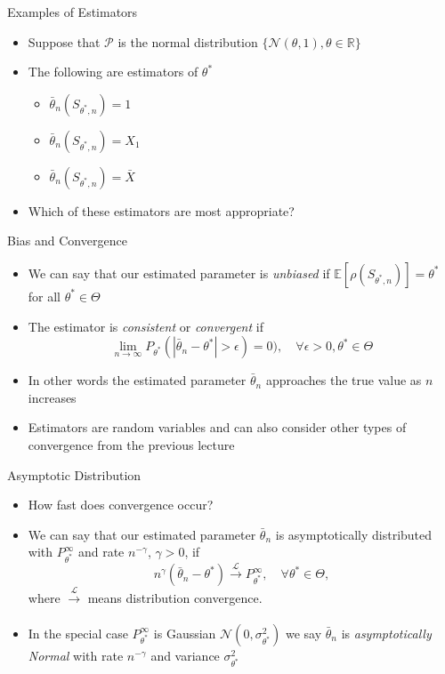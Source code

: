 \documentclass{beamer}
\begin{document}
\begin{frame}{Examples of Estimators}  
\begin{itemize} 
 \item Suppose that $\mathcal{P}$ is the normal distribution $\{\mathcal{N}(\theta, 1), \theta \in \mathbb{R}\}$  
 \item The following are estimators of $\theta^*$ 
 \begin{itemize}
 \item $\bar{\theta}_n(S_{\theta^*,n}) = 1$
 \item $\bar{\theta}_n(S_{\theta^*,n}) = X_1$
 \item $\bar{\theta}_n(S_{\theta^*,n}) = \bar{X}$
 \end{itemize} 
 \item Which of these estimators are most appropriate? 
\end{itemize}
\end{frame}

\begin{frame}{Bias and Convergence}  
\begin{itemize} 
\item We can say that our estimated parameter is \emph{unbiased} if $\mathbb{E}[\rho(S_{\theta^*,n})] = \theta^*$ for all $\theta^* \in \Theta$
\item The estimator is \emph{consistent} or \emph{convergent} if 
\begin{displaymath} 
 \lim_{n \rightarrow \infty} P_{\theta^*}(|\bar{\theta}_n - \theta^*| > \epsilon) = 0), \quad \forall \epsilon > 0, \theta^* \in \Theta 
\end{displaymath}
\item In other words the estimated parameter $\bar{\theta}_n$ approaches the true value as $n$ increases 
\item Estimators are random variables and can also consider other types of convergence from the previous lecture
\end{itemize}
\end{frame}

\begin{frame}{Asymptotic Distribution} 
\begin{itemize} 
 \item How fast does convergence occur? 
 \item We can say that our estimated parameter $\bar{\theta}_n$ is asymptotically distributed with $P_{\theta^*}^\infty$ and rate $n^{-\gamma}$, $\gamma > 0$, if 
 \begin{displaymath}
  n^\gamma(\bar{\theta}_n - \theta^*) \xrightarrow[]{\mathcal{L}} P_{\theta^*}^\infty, \quad \forall  \theta^* \in \Theta, 
 \end{displaymath}
where $\xrightarrow[]{\mathcal{L}}$ means distribution convergence. 
\item In the special case $P_{\theta^*}^\infty$ is Gaussian $\mathcal{N}(0, \sigma^2_{\theta^*})$ we say $\bar{\theta}_n$ is \emph{asymptotically Normal} with rate $n^{-\gamma}$ and variance $\sigma^2_{\theta^*}$ 
\end{itemize}
\end{frame}
\end{document}
